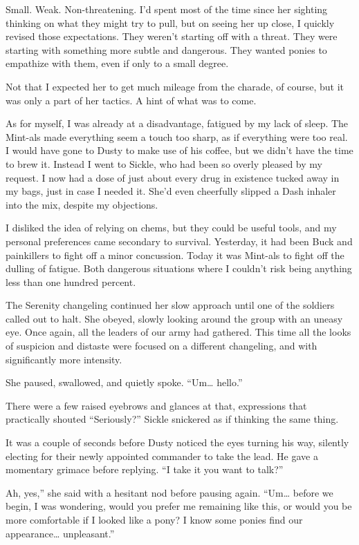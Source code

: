 Small. Weak. Non-threatening. I’d spent most of the time since her sighting thinking on what they might try to pull, but on seeing her up close, I quickly revised those expectations. They weren’t starting off with a threat. They were starting with something more subtle and dangerous. They wanted ponies to empathize with them, even if only to a small degree.

Not that I expected her to get much mileage from the charade, of course, but it was only a part of her tactics. A hint of what was to come.

As for myself, I was already at a disadvantage, fatigued by my lack of sleep. The Mint-als made everything seem a touch too sharp, as if everything were too real. I would have gone to Dusty to make use of his coffee, but we didn’t have the time to brew it. Instead I went to Sickle, who had been so overly pleased by my request. I now had a dose of just about every drug in existence tucked away in my bags, just in case I needed it. She’d even cheerfully slipped a Dash inhaler into the mix, despite my objections.

I disliked the idea of relying on chems, but they could be useful tools, and my personal preferences came secondary to survival. Yesterday, it had been Buck and painkillers to fight off a minor concussion. Today it was Mint-als to fight off the dulling of fatigue. Both dangerous situations where I couldn’t risk being anything less than one hundred percent.

The Serenity changeling continued her slow approach until one of the soldiers called out to halt. She obeyed, slowly looking around the group with an uneasy eye. Once again, all the leaders of our army had gathered. This time all the looks of suspicion and distaste were focused on a different changeling, and with significantly more intensity.

She paused, swallowed, and quietly spoke. “Um… hello.”

There were a few raised eyebrows and glances at that, expressions that practically shouted “Seriously?” Sickle snickered as if thinking the same thing.

It was a couple of seconds before Dusty noticed the eyes turning his way, silently electing for their newly appointed commander to take the lead. He gave a momentary grimace before replying. “I take it you want to talk?”

\leavevmode{}Ah, yes,” she said with a hesitant nod before pausing again. “Um… before we begin, I was wondering, would you prefer me remaining like this, or would you be more comfortable if I looked like a pony? I know some ponies find our appearance… unpleasant.”

